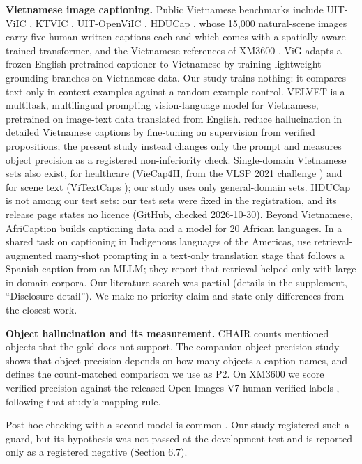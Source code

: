 \textbf{Vietnamese image captioning.} Public Vietnamese benchmarks include UIT-ViIC
\citep{Lam2020UITViIC}, KTVIC \citep{Pham2024KTVIC}, UIT-OpenViIC
\citep{Bui2023OpenViIC, Bui2026OpenViICJournal}, HDUCap \citep{Hoang2026HDUCap}, whose 15,000
natural-scene images carry five human-written captions each and which comes with a spatially-aware
trained transformer, and the Vietnamese references of XM3600 \citep{Thapliyal2022XM3600}. ViG
\citep{Vu2026ViG} adapts a frozen English-pretrained captioner to Vietnamese by training lightweight
grounding branches on Vietnamese data. Our study trains nothing: it compares text-only in-context
examples against a random-example control. VELVET \citep{Vu2025VELVET} is a multitask, multilingual
prompting vision-language model for Vietnamese, pretrained on image-text data translated from
English. \citet{Nguyen2026FAIR} reduce hallucination in detailed Vietnamese captions by fine-tuning
on supervision from verified propositions; the present study instead changes only the prompt and
measures object precision as a registered non-inferiority check. Single-domain Vietnamese sets also
exist, for healthcare (VieCap4H, from the VLSP 2021 challenge \citep{Nguyen2022VieCap4H}) and for
scene text (ViTextCaps \citep{Nguyen2026ViTextCaps}); our study uses only general-domain sets.
HDUCap is not among our test sets: our test sets were fixed in the registration, and its release
page states no licence (GitHub, checked 2026-10-30). Beyond Vietnamese, AfriCaption
\citep{Oduwole2025AfriCaption} builds captioning data and a model for 20 African languages. In a
shared task on captioning in Indigenous languages of the Americas, \citet{Dhawan2026Gators} use
retrieval-augmented many-shot prompting in a text-only translation stage that follows a Spanish
caption from an MLLM; they report that retrieval helped only with large in-domain corpora. Our
literature search was partial (details in the supplement, ``Disclosure detail''). We make no
priority claim and state only differences from the closest work.

\textbf{Object hallucination and its measurement.} CHAIR \citep{Rohrbach2018CHAIR} counts mentioned
objects that the gold does not support. The companion object-precision study shows that object
precision depends on how many objects a caption names, and defines the count-matched comparison we
use as P2. On XM3600 we score verified precision against the released Open Images V7 human-verified
labels \citep{Kuznetsova2020OpenImages}, following that study's mapping rule.

Post-hoc checking with a second model is common \citep{Yin2023Woodpecker}. Our study registered such
a guard, but its hypothesis was not passed at the development test and is reported only as a
registered negative (Section 6.7).

